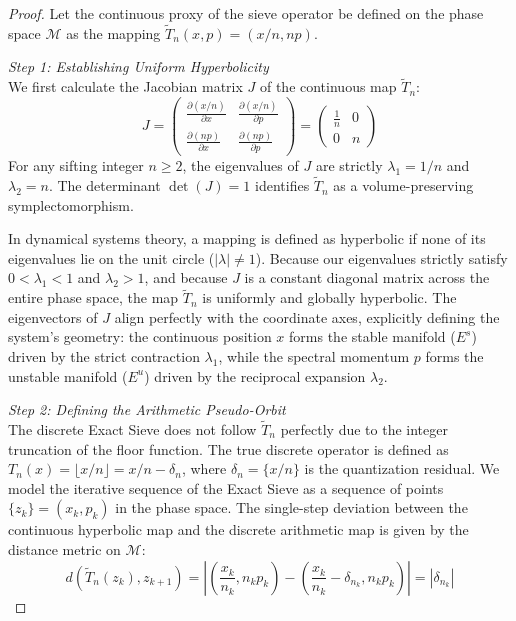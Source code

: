 \documentclass[sn-mathphys-num, pdflatex, referee]{sn-jnl}
\begin{document}
\begin{proof}
Let the continuous proxy of the sieve operator be defined on the phase space $\mathcal{M}$ as the mapping $\tilde{T}_n(x,p) = (x/n, np)$. 

\textit{Step 1: Establishing Uniform Hyperbolicity}\\
We first calculate the Jacobian matrix $J$ of the continuous map $\tilde{T}_n$:
\begin{equation}
\label{Jacob}
J = \begin{pmatrix} \frac{\partial(x/n)}{\partial x} & \frac{\partial(x/n)}{\partial p} \\ \frac{\partial(np)}{\partial x} & \frac{\partial(np)}{\partial p} \end{pmatrix} = \begin{pmatrix} \frac{1}{n} & 0 \\ 0 & n \end{pmatrix}
\end{equation}
For any sifting integer $n \ge 2$, the eigenvalues of $J$ are strictly $\lambda_1 = 1/n$ and $\lambda_2 = n$. The determinant $\det(J) = 1$ identifies $\tilde{T}_n$ as a volume-preserving symplectomorphism. 

In dynamical systems theory, a mapping is defined as hyperbolic if none of its eigenvalues lie on the unit circle ($|\lambda| \neq 1$). Because our eigenvalues strictly satisfy $0 < \lambda_1 < 1$ and $\lambda_2 > 1$, and because $J$ is a constant diagonal matrix across the entire phase space, the map $\tilde{T}_n$ is uniformly and globally hyperbolic. The eigenvectors of $J$ align perfectly with the coordinate axes, explicitly defining the system's geometry: the continuous position $x$ forms the stable manifold ($E^s$) driven by the strict contraction $\lambda_1$, while the spectral momentum $p$ forms the unstable manifold ($E^u$) driven by the reciprocal expansion $\lambda_2$.

\textit{Step 2: Defining the Arithmetic Pseudo-Orbit}\\
The discrete Exact Sieve does not follow $\tilde{T}_n$ perfectly due to the integer truncation of the floor function. The true discrete operator is defined as $T_n(x) = \lfloor x/n \rfloor = x/n - \delta_n$, where $\delta_n = \{x/n\}$ is the quantization residual.
We model the iterative sequence of the Exact Sieve as a sequence of points $\{z_k\} = (x_k, p_k)$ in the phase space. The single-step deviation between the continuous hyperbolic map and the discrete arithmetic map is given by the distance metric on $\mathcal{M}$:
\begin{equation}
d(\tilde{T}_n(z_k), z_{k+1}) = \left| \left( \frac{x_k}{n_k}, n_k p_k \right) - \left( \frac{x_k}{n_k} - \delta_{n_k}, n_k p_k \right) \right| = |\delta_{n_k}|
\end{equation}


\end{proof}
\end{document}
